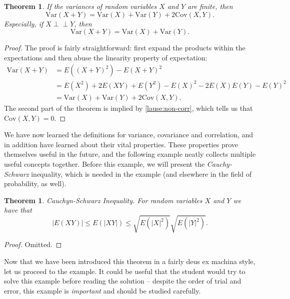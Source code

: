 \documentclass[12pt,a4paper,leqno]{report}
\newcommand{\var}{\mathrm{Var}}
\newcommand{\cov}{\mathrm{Cov}}
\def\independent{\perp\!\!\!\perp}
\theoremstyle{plain}
\newtheorem{lause}[equation]{Theorem}
\theoremstyle{definition}
\begin{document}
\begin{lause}
If the variances of random variables $X$ and $Y$ are finite, then
\[
\var(X + Y) = \var(X) + \var(Y) + 2\cov(X,Y).
\]
Especially, if $X \independent Y$, then
\[
\var(X + Y) = \var(X) + \var(Y).
\]
\end{lause}

\begin{proof}
The proof is fairly straightforward: first expand the products within the expectations and then abuse the linearity property of expectation:
\[
\begin{split}
\var(X+Y) &= E((X+Y)^2) - E(X+Y)^2 \\
			    &=E(X^2) + 2E(XY) + E(Y^2) - E(X)^2 - 2E(X)E(Y) - E(Y)^2 \\
			    &= \var(X) + \var(Y) + 2 \cov(X,Y).
\end{split}
\]
The second part of the theorem is implied by \ref{lause:non-corr}, which tells us that $\cov(X,Y) = 0$. 
\end{proof}

\bigskip

We have now learned the definitions for variance, covariance and correlation, and in addition have learned about their vital properties. These properties prove themselves useful in the future, and the following example neatly collects multiple useful concepts together. Before this example, we will present the \emph{Cauchy-Schwarz} inequality, which is needed in the example (and elsewhere in the field of probability, as well).

\begin{lause}
\label{lause:cauchy_schwarz}
Cauchyn-Schwarz Inequality.  For random variables $X$ and $Y$ we have that
\[
|E(XY)| \leq E(|XY|) \leq \sqrt{E(|X|^2)} \sqrt{E(|Y|^2)}.
\]
\end{lause}
\begin{proof}
Omitted.
\end{proof}

Now that we have been introduced this theorem in a fairly deus ex machina style, let us proceed to the example. It could be useful that the student would try to solve this example before reading the solution -- despite the order of trial and error, this example is \emph{important} and should be studied carefully.
\end{document}
